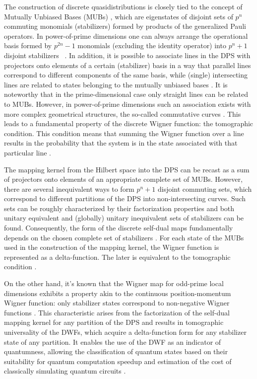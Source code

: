 \documentclass[quantumrep,article,submit,pdftex,moreauthors]{Definitions/mdpi}
\begin{document}
The construction of discrete quasidistributions is closely tied to the concept
of Mutually Unbiased Bases (MUBs) \cite{ivanovic,mubs1,mubs2}, which are
eigenstates of disjoint sets of $p^{n}$ commuting monomials (stabilizers) formed
by products of the generalized Pauli operators. In power-of-prime dimensions one
can always arrange the operational basis formed by $p^{2n}-1$ monomials
(excluding the identity operator) into $p^{n}+1$ disjoint stabilizers
~\cite{Bandyopadhyay2002}. In addition, it is possible to associate lines in the
DPS with projectors onto elements of a certain (stabilizer) basis in a way that
parallel lines correspond to different components of the same basis, while
(single) intersecting lines are related to states belonging to the mutually
unbiased bases \cite{wootters1}. It is noteworthy that in the prime-dimensional
case only straight lines can be related to MUBs.  However, in power-of-prime
dimensions such an association exists with more complex geometrical structures,
the so-called commutative curves \cite{GS2,JPA09}. This leads to a fundamental
property of the discrete Wigner function: the tomographic condition. This
condition means that summing the Wigner function over a line results in the
probability that the system is in the state associated with that particular line
\cite{wootters1, gibbons}.

The mapping kernel from the Hilbert space into the DPS can be recast as a sum of
projectors onto elements of an appropriate complete set of MUBs.  However, there
are several inequivalent ways to form $p^{n}+1$ disjoint commuting sets, which
correspond to different partitions of the DPS into non-intersecting curves. Such
sets can be roughly characterized by their factorization properties and both
unitary equivalent and (globally) unitary inequivalent sets of stabilizers can
be found. Consequently, the form of the discrete self-dual maps fundamentally
depends on the chosen complete set of stabilizers \cite{Bjork2007}. For each
state of the MUBs used in the construction of the mapping kernel, the Wigner
function is represented as a delta-function. The later is equivalent to the
tomographic condition \cite{gibbons,galvao,cormick,DFW11,DFW12}.

On the other hand, it's known that the Wigner map for odd-prime local dimensions
exhibits a property akin to the continuous position-momentum Wigner function:
only stabilizer states correspond to non-negative Wigner functions \cite{gross}.
This characteristic arises from the factorization of the self-dual mapping
kernel for any partition of the DPS and results in tomographic universality of
the DWFs, which acquire a delta-function form for any stabilizer state of any
partition. It enables the use of the DWF as an indicator of quantumness,
allowing the classification of quantum states based on their suitability for
quantum computation speedup and estimation of the cost of classically simulating
quantum circuits \cite{Raus17,UniqueWF, cohomo, contextMagic, WignerContext}.
\end{document}
